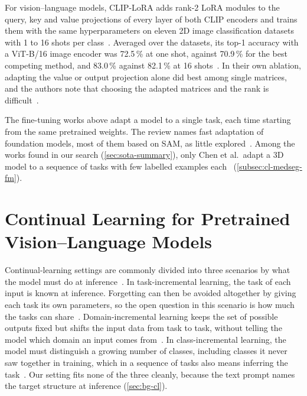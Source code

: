 For vision--language models, CLIP-LoRA adds rank-2 LoRA modules to the query, key and value projections of every layer of both CLIP encoders and trains them with the same hyperparameters on eleven 2D image classification datasets with 1 to 16 shots per class~\cite{zanella2024lowrankfewshotadaptationvisionlanguage}.
Averaged over the datasets, its top-1 accuracy with a ViT-B/16 image encoder was 72.5\,\% at one shot, against 70.9\,\% for the best competing method, and 83.0\,\% against 82.1\,\% at 16 shots~\cite{zanella2024lowrankfewshotadaptationvisionlanguage}.
In their own ablation, adapting the value or output projection alone did best among single matrices, and the authors note that choosing the adapted matrices and the rank is difficult~\cite{zanella2024lowrankfewshotadaptationvisionlanguage}.

The fine-tuning works above adapt a model to a single task, each time starting from the same pretrained weights.
The review names fast adaptation of foundation models, most of them based on SAM, as little explored~\cite[Sec.~5.6]{theekshana26fewshot}.
Among the works found in our search (\cref{sec:sota-summary}), only Chen et al.\ adapt a 3D model to a sequence of tasks with few labelled examples each~\cite{chen2026fewshotcontinuallearning3d} (\cref{subsec:cl-medseg-fm}).

\section{Continual Learning for Pretrained Vision--Language Models}
\label{sec:cl-vlm}

Continual-learning settings are commonly divided into three scenarios by what the model must do at inference~\cite{van_de_Ven_2025}.
In task-incremental learning, the task of each input is known at inference.
Forgetting can then be avoided altogether by giving each task its own parameters, so the open question in this scenario is how much the tasks can share~\cite{van_de_Ven_2025}.
Domain-incremental learning keeps the set of possible outputs fixed but shifts the input data from task to task, without telling the model which domain an input comes from~\cite{van_de_Ven_2025}.
In class-incremental learning, the model must distinguish a growing number of classes, including classes it never saw together in training, which in a sequence of tasks also means inferring the task~\cite{van_de_Ven_2025}.
Our setting fits none of the three cleanly, because the text prompt names the target structure at inference (\cref{sec:bg-cl}).

